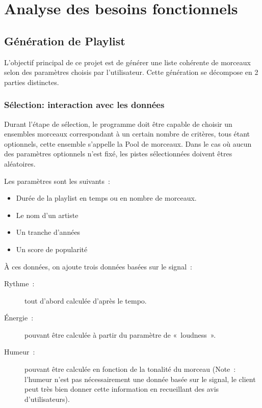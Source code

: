 \newpage
\section{Analyse des besoins fonctionnels}
\label{besoins:fonc}

\subsection{Génération de Playlist}
\label{besoins:fonc:generation}

L’objectif principal de ce projet est de générer une liste cohérente de morceaux
selon des paramètres choisis par l’utilisateur. Cette génération se décompose en 2 parties distinctes.

\subsubsection{Sélection: interaction avec les données}
\label{besoins:fonc:generation:selection}

Durant l’étape de sélection, le programme doit être capable de choisir un ensembles
morceaux correspondant à un certain nombre de critères, tous étant optionnels, cette ensemble s'appelle la Pool de morceaux.
Dans le cas où aucun des paramètres optionnels n’est fixé, les pistes
sélectionnées doivent êtres aléatoires.

\vspace{3mm}
\noindent Les paramètres sont les suivants~:
\begin{itemize}
\item Durée de la playlist en temps ou en nombre de morceaux.
\item Le nom d'un artiste
\item Un tranche d'années
\item Un score de popularité
\end{itemize}

\vspace{3mm}
\noindent À ces données, on ajoute trois données basées sur le signal~:
\begin{description}
\item[Rythme~:] tout d’abord calculée d’après le tempo.
\item[Énergie~:] pouvant être calculée à partir du paramètre de «~loudness~».
\item[Humeur~:] pouvant être calculée en fonction de la tonalité du morceau (Note~: l’humeur
n’est pas nécessairement une donnée basée sur le signal, le client peut très bien
donner cette information en recueillant des avis d’utilisateurs).
\end{description}

